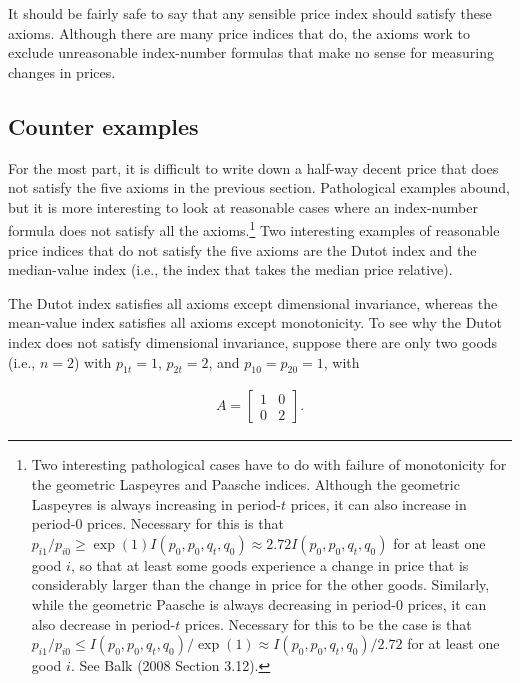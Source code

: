 \documentclass[]{article}
\begin{document}
It should be fairly safe to say that any sensible price index should satisfy these axioms. Although there are many price indices that do, the axioms work to exclude unreasonable index-number formulas that make no sense for measuring changes in prices.

\hypertarget{counter-examples}{%
\subsection{Counter examples}\label{counter-examples}}

For the most part, it is difficult to write down a half-way decent price that does not satisfy the five axioms in the previous section. Pathological examples abound, but it is more interesting to look at reasonable cases where an index-number formula does not satisfy all the axioms.\footnote{Two interesting pathological cases have to do with failure of monotonicity for the geometric Laspeyres and Paasche indices. Although the geometric Laspeyres is always increasing in period-\(t\) prices, it can also increase in period-0 prices. Necessary for this is that \(p_{i1} / p_{i0} \geq \exp(1) I(p_{0}, p_{0}, q_{t}, q_{0}) \approx 2.72 I(p_{0}, p_{0}, q_{t}, q_{0})\) for at least one good \(i\), so that at least some goods experience a change in price that is considerably larger than the change in price for the other goods. Similarly, while the geometric Paasche is always decreasing in period-0 prices, it can also decrease in period-\(t\) prices. Necessary for this to be the case is that \(p_{i1} / p_{i0} \leq I(p_{0}, p_{0}, q_{t}, q_{0}) / \exp(1) \approx I(p_{0}, p_{0}, q_{t}, q_{0}) / 2.72\) for at least one good \(i\). See Balk (2008 Section 3.12).} Two interesting examples of reasonable price indices that do not satisfy the five axioms are the Dutot index and the median-value index (i.e., the index that takes the median price relative).

The Dutot index satisfies all axioms except dimensional invariance, whereas the mean-value index satisfies all axioms except monotonicity. To see why the Dutot index does not satisfy dimensional invariance, suppose there are only two goods (i.e., \(n = 2\)) with \(p_{1t} = 1\), \(p_{2t} = 2\), and \(p_{10} = p_{20} = 1\), with

\begin{align*}
A = 
\begin{bmatrix}
1 & 0 \\
0 & 2
\end{bmatrix}.
\end{align*}
\end{document}
